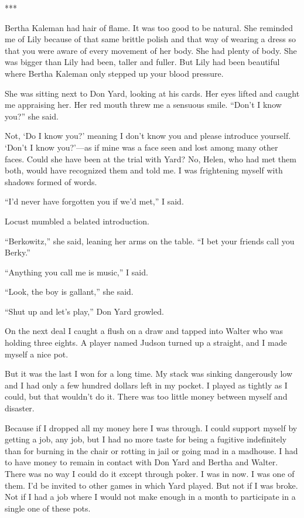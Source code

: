 \documentclass{novel}
\begin{document}
{***

Bertha Kaleman had hair of flame. It was too good to be natural. She reminded me of Lily because of that same brittle polish and that way of wearing a dress so that you were aware of every movement of her body. She had plenty of body. She was bigger than Lily had been, taller and fuller. But Lily had been beautiful where Bertha Kaleman only stepped up your blood pressure.

She was sitting next to Don Yard, looking at his cards. Her eyes lifted and caught me appraising her. Her red mouth threw me a sensuous smile. “Don’t I know you?” she said.

Not, ‘Do I know you?’ meaning I don’t know you and please introduce yourself. ‘Don’t I know you?’—as if mine was a face seen and lost among many other faces. Could she have been at the trial with Yard? No, Helen, who had met them both, would have recognized them and told me. I was frightening myself with shadows formed of words.

“I’d never have forgotten you if we’d met,” I said.

Locust mumbled a belated introduction.

“Berkowitz,” she said, leaning her arms on the table. “I bet your friends call you Berky.”

“Anything you call me is music,” I said.

“Look, the boy is gallant,” she said.

“Shut up and let’s play,” Don Yard growled.

On the next deal I caught a flush on a draw and tapped into Walter who was holding three eights. A player named Judson turned up a straight, and I made myself a nice pot.

But it was the last I won for a long time. My stack was sinking dangerously low and I had only a few hundred dollars left in my pocket. I played as tightly as I could, but that wouldn’t do it. There was too little money between myself and disaster.

Because if I dropped all my money here I was through. I could support myself by getting a job, any job, but I had no more taste for being a fugitive indefinitely than for burning in the chair or rotting in jail or going mad in a madhouse. I had to have money to remain in contact with Don Yard and Bertha and Walter. There was no way I could do it except through poker. I was in now. I was one of them. I’d be invited to other games in which Yard played. But not if I was broke. Not if I had a job where I would not make enough in a month to participate in a single one of these pots.

}
\end{document}
